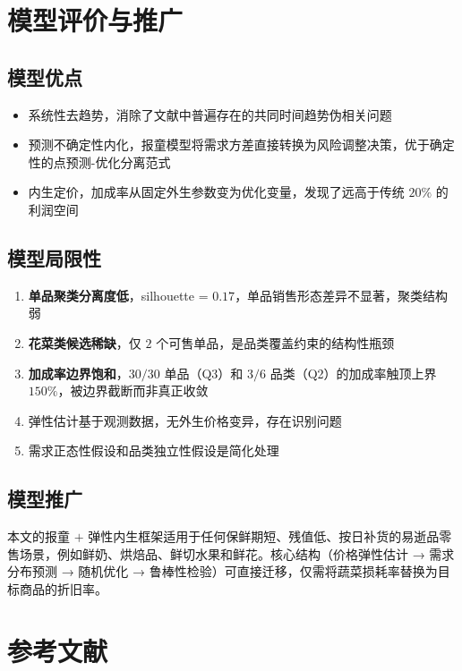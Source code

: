 \section{模型评价与推广}

\subsection{模型优点}

\begin{itemize}
\item 系统性去趋势，消除了文献中普遍存在的共同时间趋势伪相关问题
\item 预测不确定性内化，报童模型将需求方差直接转换为风险调整决策，优于确定性的点预测-优化分离范式
\item 内生定价，加成率从固定外生参数变为优化变量，发现了远高于传统 $20\%$ 的利润空间
\end{itemize}

\subsection{模型局限性}

\begin{enumerate}
\item \textbf{单品聚类分离度低}，silhouette = $0.17$，单品销售形态差异不显著，聚类结构弱
\item \textbf{花菜类候选稀缺}，仅 $2$ 个可售单品，是品类覆盖约束的结构性瓶颈
\item \textbf{加成率边界饱和}，$30/30$ 单品（Q3）和 $3/6$ 品类（Q2）的加成率触顶上界 $150\%$，被边界截断而非真正收敛
\item 弹性估计基于观测数据，无外生价格变异，存在识别问题
\item 需求正态性假设和品类独立性假设是简化处理
\end{enumerate}

\subsection{模型推广}

本文的报童 $+$ 弹性内生框架适用于任何保鲜期短、残值低、按日补货的易逝品零售场景，例如鲜奶、烘焙品、鲜切水果和鲜花。核心结构（价格弹性估计 → 需求分布预测 → 随机优化 → 鲁棒性检验）可直接迁移，仅需将蔬菜损耗率替换为目标商品的折旧率。

\newpage

\section{参考文献}

